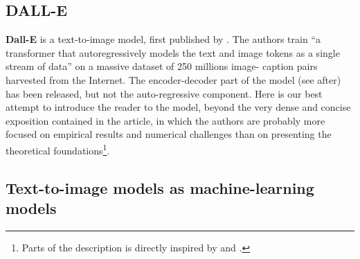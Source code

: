 \documentclass{article}
\begin{document}
\pagebreak
{}
{}
\begin{appendix}

\section{DALL-E}

\newcommand{\pt}{p_\theta}
\newcommand{\pp}{p_\psi}
\newcommand{\ptp}{p_{\theta,\psi}}
\newcommand{\qp}{q_\phi}
\newcommand{\esp}{\mathbb{E}}
\newcommand{\KL}{D_{\mathrm{KL}}}
\newcommand{\ltppxy}{\mathscr{l}_{\theta,\psi}(x,y)}
\newcommand{\elb}{\underline{\mathscr{l}}}
\newcommand{\elbtppxy}{\underline{\mathscr{l}}_{\theta,\phi,\psi}(x,y)}

\textbf{Dall-E} is a text-to-image model, first published by \citet{zeroshot}.
The authors train \enquote{a transformer that autoregressively models the text and image tokens as a single stream of data} on a massive dataset of 250 millions image- caption pairs harvested from the Internet.
The encoder-decoder part of the model (see after) has been released, but not the auto-regressive component.
Here is our best attempt to introduce the reader to the model, beyond the very dense and concise exposition contained in the article, in which the authors are probably more focused on empirical results and numerical challenges than on presenting the theoretical foundations\footnote{
Parts of the description is directly inspired by \cite{probml-advanced} and \cite{deepgen}.
}.

\subsection{Text-to-image models as machine-learning models}


\end{appendix}
\end{document}
